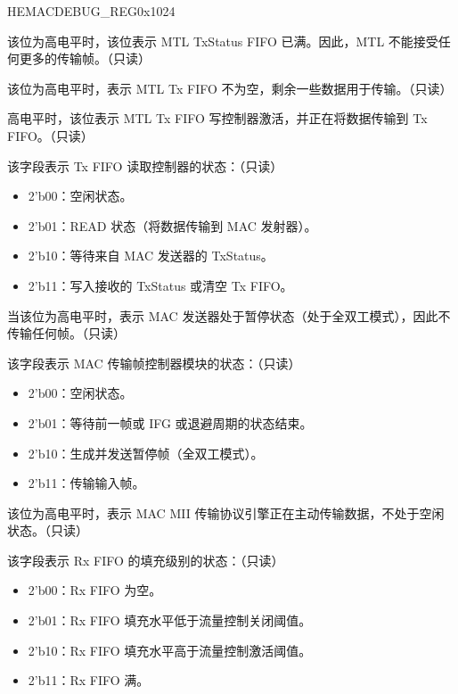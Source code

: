 \begin{register}{H}{EMACDEBUG\_REG}{0x1024}\label{regdesc:EMACDEBUGREG}
%
%
%
%
%
%
%
%
%
%
%
%
%
%
%
%
%
\regnewline%
\begin{regdesc}\begin{reglist}
\item [MTLTSFFS] 该位为高电平时，该位表示 MTL TxStatus FIFO 已满。因此，MTL 不能接受任何更多的传输帧。（只读）
\item [MTLTFNES] 该位为高电平时，表示 MTL Tx FIFO 不为空，剩余一些数据用于传输。（只读）
\item [MTLTFWCS] 高电平时，该位表示 MTL Tx FIFO 写控制器激活，并正在将数据传输到 Tx FIFO。（只读）
\item [MTLTFRCS]该字段表示 Tx FIFO 读取控制器的状态：（只读）\begin{itemize}
\item 2'b00：空闲状态。\item 2'b01：READ 状态（将数据传输到 MAC 发射器）。\item 2'b10：等待来自 MAC 发送器的 TxStatus。\item 2'b11：写入接收的 TxStatus 或清空 Tx FIFO。\end{itemize}
\item [MACTP] 当该位为高电平时，表示 MAC 发送器处于暂停状态（处于全双工模式），因此不传输任何帧。（只读）
\item [MACTFCS]该字段表示 MAC 传输帧控制器模块的状态：（只读）
\begin{itemize}
\item 2'b00：空闲状态。 \item 2'b01：等待前一帧或 IFG 或退避周期的状态结束。 \item 2'b10：生成并发送暂停帧（全双工模式）。 \item 2'b11：传输输入帧。\end{itemize}
\item [MACTPES]该位为高电平时，表示 MAC MII 传输协议引擎正在主动传输数据，不处于空闲状态。（只读）
\item [MTLRFFLS]该字段表示 Rx FIFO 的填充级别的状态：（只读） \begin{itemize}
\item 2'b00：Rx FIFO 为空。 \item 2'b01：Rx FIFO 填充水平低于流量控制关闭阈值。\item  2'b10：Rx FIFO 填充水平高于流量控制激活阈值。\item  2'b11：Rx FIFO 满。\end{itemize}

\item[寄存器描述下一页继续。]
\end{reglist}\end{regdesc}
\end{register}
